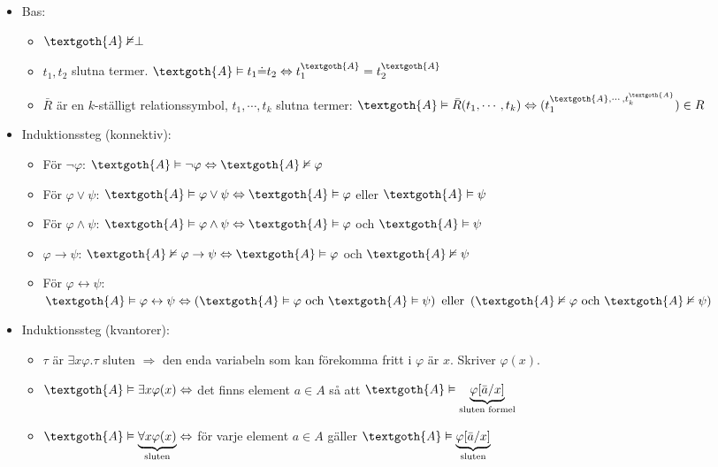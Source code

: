 \begin{itemize}
  \item Bas:
    \begin{itemize}
      \item $\textgoth{A}\nvDash\perp$
      \item $t_1,t_2$ slutna termer. $\textgoth{A}\vDash t_1\dot{=}t_2 \Lrarr t_1^{\textgoth{A}}=t_2^{\textgoth{A}}$
      \item $\bar{R}$ är en $k$-ställigt relationssymbol, $t_1,\cdots, t_k$ slutna termer: $\textgoth{A}\vDash\bar{R}(t_1,\cdots, t_k) \Lrarr (t_1^{\textgoth{A},\cdots, t_k^{\textgoth{A}}})\in R$
    \end{itemize}
  \item Induktionssteg (konnektiv):
    \begin{itemize}
      \item För $\neg\varphi$: $\textgoth{A}\vDash\neg\varphi\Lrarr\textgoth{A}\nvDash\varphi$
      \item För $\varphi\vee\psi$: $\textgoth{A}\vDash\varphi\vee\psi\Lrarr \textgoth{A}\vDash\varphi$ eller $\textgoth{A}\vDash\psi$
      \item För $\varphi\wedge\psi$: $\textgoth{A}\vDash\varphi\wedge\psi\Lrarr \textgoth{A}\vDash\varphi$ och $\textgoth{A}\vDash\psi$
      \item $\varphi\rightarrow\psi$: $\textgoth{A}\nvDash\varphi\rightarrow\psi\Lrarr \textgoth{A}\vDash\varphi$ och $\textgoth{A}\nvDash\psi$
      \item För $\varphi\leftrightarrow\psi$: $\textgoth{A}\vDash\varphi\leftrightarrow\psi\Lrarr\left(\textgoth{A}\vDash\varphi\text{ och } \textgoth{A}\vDash\psi\right)\text{ eller }\left(\textgoth{A}\nvDash\varphi\text{ och }\textgoth{A}\nvDash\psi\right)$
    \end{itemize}
  \item Induktionssteg (kvantorer):
    \begin{itemize}
      \item $\tau$ är $\exists x\varphi$.\qquad $\tau$ sluten $\Rightarrow$ den enda variabeln som kan förekomma fritt i $\varphi$ är $x$. Skriver $\varphi(x)$.
      \item $\textgoth{A}\vDash\exists x\varphi(x)\Lrarr$ det finns element $a\in A$ så att $\textgoth{A}\vDash\underbrace{\varphi[\bar{a}/x]}_{\text{sluten formel}}$
      \item $\textgoth{A}\vDash\underbrace{\forall x\varphi(x)}_{\text{sluten}}\Lrarr$ för varje element $a\in A$ gäller $\textgoth{A}\vDash\underbrace{\varphi[\bar{a}/x]}_{\text{sluten}}$
    \end{itemize}
\end{itemize}
